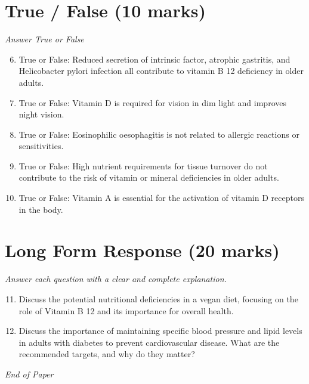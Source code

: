 \documentclass[12pt]{article}
\begin{document}
\section*{True / False (10 marks)}
\textit{Answer True or False}
\begin{enumerate}[label=\arabic*.]
\setcounter{enumi}{5}
\item True or False: Reduced secretion of intrinsic factor, atrophic gastritis, and Helicobacter pylori infection all contribute to vitamin B 12 deficiency in older adults.
\item True or False: Vitamin D is required for vision in dim light and improves night vision.
\item True or False: Eosinophilic oesophagitis is not related to allergic reactions or sensitivities.
\item True or False: High nutrient requirements for tissue turnover do not contribute to the risk of vitamin or mineral deficiencies in older adults.
\item True or False: Vitamin A is essential for the activation of vitamin D receptors in the body.
\end{enumerate}

\section*{Long Form Response (20 marks)}
\textit{Answer each question with a clear and complete explanation.}
\begin{enumerate}[label=\arabic*.]
\setcounter{enumi}{10}
\item Discuss the potential nutritional deficiencies in a vegan diet, focusing on the role of Vitamin B 12 and its importance for overall health.
\item Discuss the importance of maintaining specific blood pressure and lipid levels in adults with diabetes to prevent cardiovascular disease. What are the recommended targets, and why do they matter?
\end{enumerate}

\vfill
\noindent\textit{End of Paper}
\end{document}
